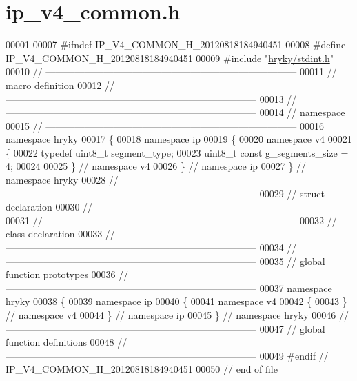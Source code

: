 \hypertarget{ip__v4__common_8h_source}{\section{ip\-\_\-v4\-\_\-common.\-h}
}

\begin{DoxyCode}
00001 
00007 \textcolor{preprocessor}{#ifndef IP\_V4\_COMMON\_H\_20120818184940451}
00008 \textcolor{preprocessor}{}\textcolor{preprocessor}{#define IP\_V4\_COMMON\_H\_20120818184940451}
00009 \textcolor{preprocessor}{}\textcolor{preprocessor}{#include "\hyperlink{stdint_8h}{hryky/stdint.h}"}
00010 \textcolor{comment}{//
      ------------------------------------------------------------------------------}
00011 \textcolor{comment}{// macro definition}
00012 \textcolor{comment}{//
      ------------------------------------------------------------------------------}
00013 \textcolor{comment}{//
      ------------------------------------------------------------------------------}
00014 \textcolor{comment}{// namespace}
00015 \textcolor{comment}{//
      ------------------------------------------------------------------------------}
00016 \textcolor{keyword}{namespace }hryky
00017 \{
00018 \textcolor{keyword}{namespace }ip
00019 \{
00020 \textcolor{keyword}{namespace }v4
00021 \{
00022     \textcolor{keyword}{typedef} uint8\_t segment\_type;
00023     uint8\_t \textcolor{keyword}{const} g\_segments\_size = 4;
00024     
00025 \} \textcolor{comment}{// namespace v4}
00026 \} \textcolor{comment}{// namespace ip}
00027 \} \textcolor{comment}{// namespace hryky}
00028 \textcolor{comment}{//
      ------------------------------------------------------------------------------}
00029 \textcolor{comment}{// struct declaration}
00030 \textcolor{comment}{//
      ------------------------------------------------------------------------------}
00031 \textcolor{comment}{//
      ------------------------------------------------------------------------------}
00032 \textcolor{comment}{// class declaration}
00033 \textcolor{comment}{//
      ------------------------------------------------------------------------------}
00034 \textcolor{comment}{//
      ------------------------------------------------------------------------------}
00035 \textcolor{comment}{// global function prototypes}
00036 \textcolor{comment}{//
      ------------------------------------------------------------------------------}
00037 \textcolor{keyword}{namespace }hryky
00038 \{
00039 \textcolor{keyword}{namespace }ip
00040 \{
00041 \textcolor{keyword}{namespace }v4
00042 \{
00043 \} \textcolor{comment}{// namespace v4}
00044 \} \textcolor{comment}{// namespace ip}
00045 \} \textcolor{comment}{// namespace hryky}
00046 \textcolor{comment}{//
      ------------------------------------------------------------------------------}
00047 \textcolor{comment}{// global function definitions}
00048 \textcolor{comment}{//
      ------------------------------------------------------------------------------}
00049 \textcolor{preprocessor}{#endif // IP\_V4\_COMMON\_H\_20120818184940451}
00050 \textcolor{preprocessor}{}\textcolor{comment}{// end of file}
\end{DoxyCode}
